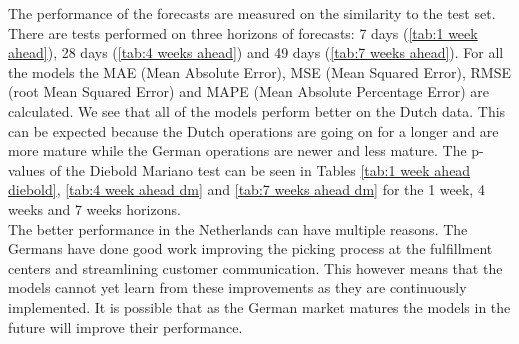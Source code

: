 The performance of the forecasts are measured on the similarity to the test set. There are tests performed on three horizons of forecasts: 7 days (\autoref{tab:1 week ahead}), 28 days (\autoref{tab:4 weeks ahead}) and 49 days (\autoref{tab:7 weeks ahead}). For all the models the MAE (Mean Absolute Error), MSE (Mean Squared Error), RMSE (root Mean Squared Error) and MAPE (Mean Absolute Percentage Error) are calculated. We see that all of the models perform better on the Dutch data. This can be expected because the Dutch operations are going on for a longer and are more mature while the German operations are newer and less mature. The p-values of the Diebold Mariano test can be seen in Tables \ref{tab:1 week ahead diebold}, \ref{tab:4 week ahead dm} and \ref{tab:7 weeks ahead dm} for the 1 week, 4 weeks and 7 weeks horizons.\\

The better performance in the Netherlands can have multiple reasons. The Germans have done good work improving the picking process at the fulfillment centers and streamlining customer communication. This however means that the models cannot yet learn from these improvements as they are continuously implemented. It is possible that as the German market matures the models in the future will improve their performance.\\

